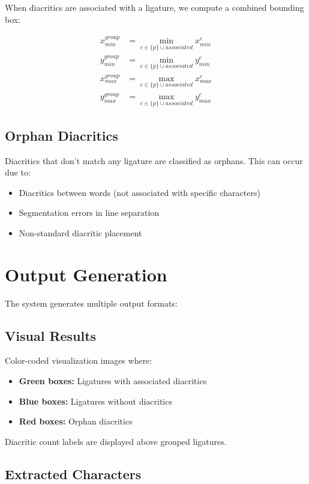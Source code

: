 \documentclass[12pt,a4paper,oneside]{report}
\begin{document}
When diacritics are associated with a ligature, we compute a combined bounding box:

\begin{align}
    x_{min}^{group} &= \min_{c \in \{p\} \cup associated} x_{min}^c \\
    y_{min}^{group} &= \min_{c \in \{p\} \cup associated} y_{min}^c \\
    x_{max}^{group} &= \max_{c \in \{p\} \cup associated} x_{max}^c \\
    y_{max}^{group} &= \max_{c \in \{p\} \cup associated} y_{max}^c
\end{align}

\subsection{Orphan Diacritics}

Diacritics that don't match any ligature are classified as orphans. This can occur due to:
\begin{itemize}
    \item Diacritics between words (not associated with specific characters)
    \item Segmentation errors in line separation
    \item Non-standard diacritic placement
\end{itemize}

\section{Output Generation}

The system generates multiple output formats:

\subsection{Visual Results}

Color-coded visualization images where:
\begin{itemize}
    \item \textbf{Green boxes:} Ligatures with associated diacritics
    \item \textbf{Blue boxes:} Ligatures without diacritics
    \item \textbf{Red boxes:} Orphan diacritics
\end{itemize}

Diacritic count labels are displayed above grouped ligatures.

\subsection{Extracted Characters}
\end{document}

